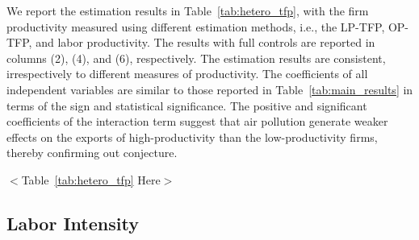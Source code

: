 \documentclass[12pt]{article}
\begin{document}


We report the estimation results in Table~\ref{tab:hetero_tfp}, with the
firm productivity measured using different estimation methods, i.e., the
LP-TFP, OP-TFP, and labor productivity. The results with full controls are
reported in columns (2), (4), and (6), respectively. The estimation results
are consistent, irrespectively to different measures of productivity. The
coefficients of all independent variables are similar to those reported in
Table~\ref{tab:main_results} in terms of the sign and statistical
significance. The positive and significant coefficients of the interaction
term suggest that air pollution generate weaker effects on the exports of
high-productivity than the low-productivity firms, thereby confirming out
conjecture. 

\begin{center}
$<$Table~\ref{tab:hetero_tfp} Here$>$
\end{center}

\subsection{Labor Intensity}
\end{document}
